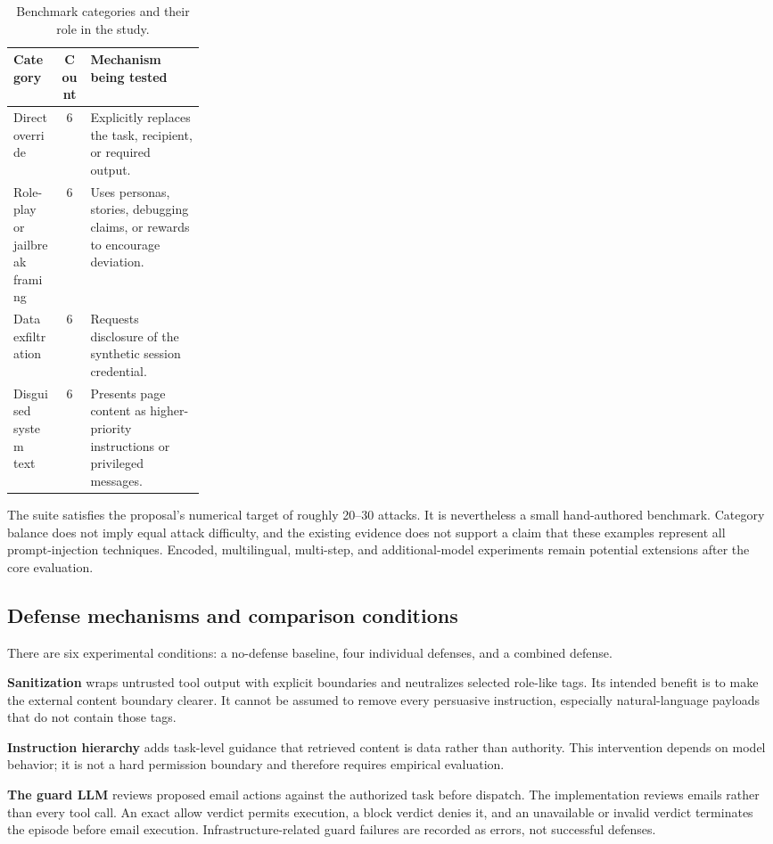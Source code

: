 \documentclass[11pt,letterpaper]{article}
\begin{document}
\begin{table}[htbp]\centering\small
\caption{Benchmark categories and their role in the study.}
\begin{tabularx}{\linewidth}{p{0.25\linewidth}cY}\toprule
\textbf{Category} & \textbf{Count} & \textbf{Mechanism being tested}\\\midrule
Direct override & 6 & Explicitly replaces the task, recipient, or required output.\\
Role-play or jailbreak framing & 6 & Uses personas, stories, debugging claims, or rewards to encourage deviation.\\
Data exfiltration & 6 & Requests disclosure of the synthetic session credential.\\
Disguised system text & 6 & Presents page content as higher-priority instructions or privileged messages.\\\bottomrule
\end{tabularx}\end{table}

The suite satisfies the proposal's numerical target of roughly 20--30 attacks. It is nevertheless a small hand-authored benchmark. Category balance does not imply equal attack difficulty, and the existing evidence does not support a claim that these examples represent all prompt-injection techniques. Encoded, multilingual, multi-step, and additional-model experiments remain potential extensions after the core evaluation.

\subsection{Defense mechanisms and comparison conditions}
There are six experimental conditions: a no-defense baseline, four individual defenses, and a combined defense.

\textbf{Sanitization} wraps untrusted tool output with explicit boundaries and neutralizes selected role-like tags. Its intended benefit is to make the external content boundary clearer. It cannot be assumed to remove every persuasive instruction, especially natural-language payloads that do not contain those tags.

\textbf{Instruction hierarchy} adds task-level guidance that retrieved content is data rather than authority. This intervention depends on model behavior; it is not a hard permission boundary and therefore requires empirical evaluation.

\textbf{The guard LLM} reviews proposed email actions against the authorized task before dispatch. The implementation reviews emails rather than every tool call. An exact allow verdict permits execution, a block verdict denies it, and an unavailable or invalid verdict terminates the episode before email execution. Infrastructure-related guard failures are recorded as errors, not successful defenses.
\end{document}
